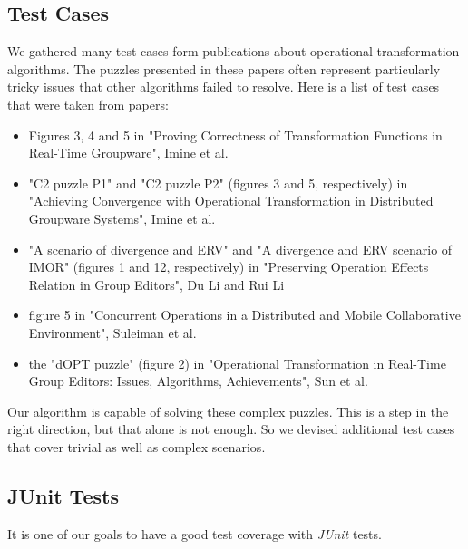 \subsection{Test Cases}
We gathered many test cases form publications about operational transformation algorithms. The puzzles presented in these papers often represent particularly tricky issues that other algorithms failed to resolve. Here is a list of test cases that were taken from papers:

\begin{itemize}
 \item Figures 3, 4 and 5 in "Proving Correctness of Transformation Functions in Real-Time Groupware", Imine et al.
 \item "C2 puzzle P1" and "C2 puzzle P2" (figures 3 and 5, respectively) in "Achieving Convergence with Operational Transformation in Distributed Groupware Systems", Imine et al.
 \item "A scenario of divergence and ERV" and  "A divergence and ERV scenario of IMOR" (figures 1 and 12, respectively) in "Preserving Operation Effects Relation in Group Editors", Du Li and Rui Li
 \item figure 5 in "Concurrent Operations in a Distributed and Mobile Collaborative Environment", Suleiman et al.
 \item the "dOPT puzzle" (figure 2) in "Operational Transformation in Real-Time Group Editors: Issues, Algorithms, Achievements", Sun et al. 
\end{itemize}

Our algorithm is capable of solving these complex puzzles. This is a step in the right direction, but that alone is not enough. So we devised additional test cases that cover trivial as well as complex scenarios.

\subsection{JUnit Tests}
It is one of our goals to have a good test coverage with \emph{JUnit} tests.
